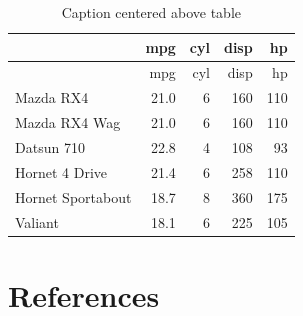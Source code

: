 \documentclass[
  letterpaper,
  DIV=11,
  numbers=noendperiod]{scrartcl}
\begin{document}
\hypertarget{tbl-simple}{}
\begin{longtable}[]{@{}lrrrr@{}}
\caption{\label{tbl-simple}Caption centered above table}\tabularnewline
\toprule()
& mpg & cyl & disp & hp \\
\midrule()
\endfirsthead
\toprule()
& mpg & cyl & disp & hp \\
\midrule()
\endhead
Mazda RX4 & 21.0 & 6 & 160 & 110 \\
Mazda RX4 Wag & 21.0 & 6 & 160 & 110 \\
Datsun 710 & 22.8 & 4 & 108 & 93 \\
Hornet 4 Drive & 21.4 & 6 & 258 & 110 \\
Hornet Sportabout & 18.7 & 8 & 360 & 175 \\
Valiant & 18.1 & 6 & 225 & 105 \\
\bottomrule()
\end{longtable}

\hypertarget{references}{%
\section*{References}\label{references}}
\end{document}
